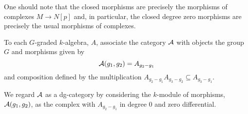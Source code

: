 \documentclass[dissertation.tex]{subfiles}
\begin{document}
\begin{remark}
  One should note that the closed morphisms are precisely the morphisms of complexes \(M \to N[p]\) and, in particular, the closed degree zero morphisms are precisely the usual morphisms of complexes.
\end{remark}

\begin{definition}
  To each \(G\)-graded \(k\)-algebra, \(A\), associate the category \(\mathcal{A}\) with objects the group \(G\) and morphisms given by
  \[\mathcal{A}(g_1, g_2) = A_{g_2 - g_1}\]
  and composition defined by the multiplication \(A_{g_2 - g_1}A_{g_3 - g_2} \subseteq A_{g_3 - g_1}\).

  We regard \(\mathcal{A}\) as a dg-category by considering the \(k\)-module of morphisms, \(\mathcal{A}(g_1, g_2)\), as the complex with \(A_{g_2 - g_1}\) in degree 0 and zero differential.
\end{definition}
\end{document}
